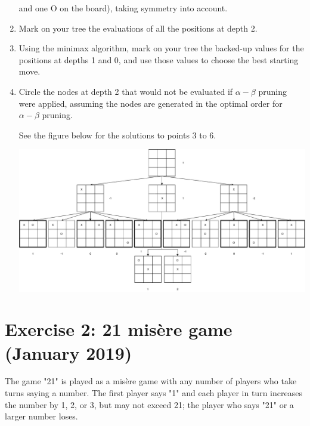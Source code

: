 \documentclass[9pt,a4paper]{extarticle}
\newenvironment{solution}
    {%
    \color{red}
    }
    { 
    \color{black}
    }
\begin{document}
\begin{enumerate}
and one O on the board), taking symmetry into account.
    \item Mark on your tree the evaluations of all the positions at depth 2.
    \item Using the minimax algorithm, mark on your tree the backed-up values for the     positions at depths 1 and 0, and use those values to choose the best starting move.
    \item Circle the nodes at depth 2 that would not be evaluated if $\alpha-\beta$ pruning were
applied, assuming the nodes are generated in the optimal order for $\alpha-\beta$ pruning.
\begin{solution}
See the figure below for the solutions to points 3 to 6.
\begin{center}
 \includegraphics[width=.7\textwidth]{figures/tictactoe.pdf}   
\end{center}

\end{solution}
\end{enumerate}
\section*{Exercise 2: 21 misère game (January 2019)}
The game "21" is played as a misère game with any number of players who take turns saying a number. The first player says "1" and each player in turn increases the number by 1, 2, or 3, but may not exceed 21; the player who says "21" or a larger number   loses. 
\end{document}

